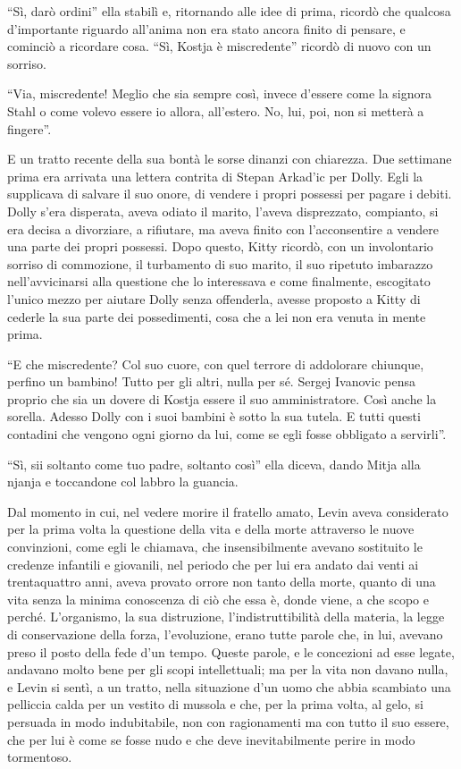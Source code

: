 ``Sì, darò ordini'' ella stabilì e, ritornando alle idee di prima, ricordò che qualcosa d'importante riguardo all'anima non era stato ancora finito di pensare, e cominciò a ricordare cosa. ``Sì, Kostja è miscredente'' ricordò di nuovo con un sorriso. 

``Via, miscredente! Meglio che sia sempre così, invece d'essere come la signora Stahl o come volevo essere io allora, all'estero. No, lui, poi, non si metterà a fingere''. 

E un tratto recente della sua bontà le sorse dinanzi con chiarezza. Due settimane prima era arrivata una lettera contrita di Stepan Arkad'ic per Dolly. Egli la supplicava di salvare il suo onore, di vendere i propri possessi per pagare i debiti. Dolly s'era disperata, aveva odiato il marito, l'aveva disprezzato, compianto, si era decisa a divorziare, a rifiutare, ma aveva finito con l'acconsentire a vendere una parte dei propri possessi. Dopo questo, Kitty ricordò, con un involontario sorriso di commozione, il turbamento di suo marito, il suo ripetuto imbarazzo nell'avvicinarsi alla questione che lo interessava e come finalmente, escogitato l'unico mezzo per aiutare Dolly senza offenderla, avesse proposto a Kitty di cederle la sua parte dei possedimenti, cosa che a lei non era venuta in mente prima. 

``E che miscredente? Col suo cuore, con quel terrore di addolorare chiunque, perfino un bambino! Tutto per gli altri, nulla per sé. Sergej Ivanovic pensa proprio che sia un dovere di Kostja essere il suo amministratore. Così anche la sorella. Adesso Dolly con i suoi bambini è sotto la sua tutela. E tutti questi contadini che vengono ogni giorno da lui, come se egli fosse obbligato a servirli''. 

``Sì, sii soltanto come tuo padre, soltanto così'' ella diceva, dando Mitja alla njanja e toccandone col labbro la guancia. 

\label{viii-7} 

Dal momento in cui, nel vedere morire il fratello amato, Levin aveva considerato per la prima volta la questione della vita e della morte attraverso le nuove convinzioni, come egli le chiamava, che insensibilmente avevano sostituito le credenze infantili e giovanili, nel periodo che per lui era andato dai venti ai trentaquattro anni, aveva provato orrore non tanto della morte, quanto di una vita senza la minima conoscenza di ciò che essa è, donde viene, a che scopo e perché. L'organismo, la sua distruzione, l'indistruttibilità della materia, la legge di conservazione della forza, l'evoluzione, erano tutte parole che, in lui, avevano preso il posto della fede d'un tempo. Queste parole, e le concezioni ad esse legate, andavano molto bene per gli scopi intellettuali; ma per la vita non davano nulla, e Levin si sentì, a un tratto, nella situazione d'un uomo che abbia scambiato una pelliccia calda per un vestito di mussola e che, per la prima volta, al gelo, si persuada in modo indubitabile, non con ragionamenti ma con tutto il suo essere, che per lui è come se fosse nudo e che deve inevitabilmente perire in modo tormentoso. 

